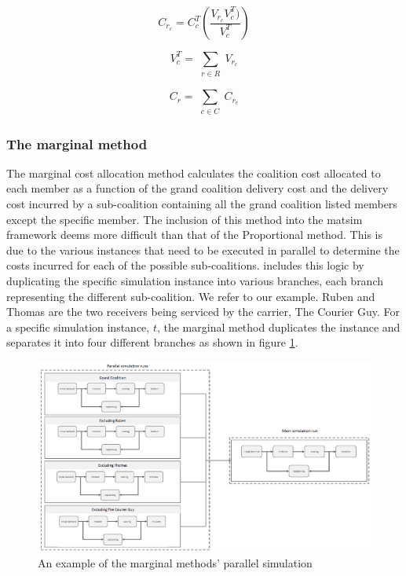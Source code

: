 \begin{equation}
\label{eq:prop_cost}
    C_{r_c} = C_c ^T ( \frac{V_{r_c}{V_c^T})
}{V_c^T})
\end{equation}

\begin{equation}
\label{eq:prop_volume}
    V_c^T = \sum_{\substack{r \in R}} V_{r_c}
\end{equation}

\begin{equation}
\label{eq:prop_cost_receiver}
    C_r = \sum_{\substack{ c \in C}} C_{r_c}
\end{equation}

\subsubsection{The marginal method}
The marginal cost allocation method calculates the coalition cost allocated to each member as a function of the grand coalition delivery cost and the delivery cost incurred by a sub-coalition containing all the grand coalition listed members except the specific member. The inclusion of this method into the \acrshort{matsim} framework deems more difficult than that of the Proportional method. This is due to the various instances that need to be executed in parallel to determine the costs incurred for each of the possible sub-coalitions. \citet{bean2020behavioural} includes this logic by duplicating the specific simulation instance into various branches, each branch representing the different sub-coalition. We refer to our example. Ruben and Thomas are the two receivers being serviced by the carrier, The Courier Guy. For a specific simulation instance, \(t\), the marginal method duplicates the instance and separates it into four different branches as shown in figure \ref{fig:marginal_example}. 


\begin{figure}[h]
    \centering
    \includegraphics[width=1\textwidth]{images/marginal_example.PNG}
    \caption{An example of the marginal methods' parallel simulation}
    \label{fig:marginal_example}
\end{figure}

